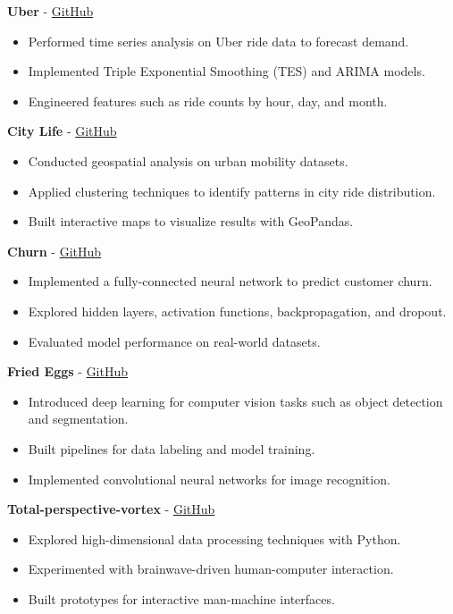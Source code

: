\documentclass[a4paper,11pt]{article}%
\begin{document}
%
\noindent \textbf{Uber} - \href{https://github.com/sboof911/Uber}{GitHub}%
\begin{itemize}[leftmargin=2em,label={},parsep=0pt,topsep=1em]%
\item Performed time series analysis on Uber ride data to forecast demand.%
\item Implemented Triple Exponential Smoothing (TES) and ARIMA models.%
\item Engineered features such as ride counts by hour, day, and month.%
\end{itemize}%
%
\noindent \textbf{City Life} - \href{https://github.com/sboof911/City-Life}{GitHub}%
\begin{itemize}[leftmargin=2em,label={},parsep=0pt,topsep=1em]%
\item Conducted geospatial analysis on urban mobility datasets.%
\item Applied clustering techniques to identify patterns in city ride distribution.%
\item Built interactive maps to visualize results with GeoPandas.%
\end{itemize}%
%
\noindent \textbf{Churn} - \href{https://github.com/sboof911/churn}{GitHub}%
\begin{itemize}[leftmargin=2em,label={},parsep=0pt,topsep=1em]%
\item Implemented a fully-connected neural network to predict customer churn.%
\item Explored hidden layers, activation functions, backpropagation, and dropout.%
\item Evaluated model performance on real-world datasets.%
\end{itemize}%
%
\noindent \textbf{Fried Eggs} - \href{https://github.com/sboof911/Fried-eggs}{GitHub}%
\begin{itemize}[leftmargin=2em,label={},parsep=0pt,topsep=1em]%
\item Introduced deep learning for computer vision tasks such as object detection and segmentation.%
\item Built pipelines for data labeling and model training.%
\item Implemented convolutional neural networks for image recognition.%
\end{itemize}%
%
\noindent \textbf{Total-perspective-vortex} - \href{https://github.com/sboof911/total-perspectivevortex}{GitHub}%
\begin{itemize}[leftmargin=2em,label={},parsep=0pt,topsep=1em]%
\item Explored high-dimensional data processing techniques with Python.%
\item Experimented with brainwave-driven human-computer interaction.%
\item Built prototypes for interactive man-machine interfaces.%
\end{itemize}%
\end{document}
